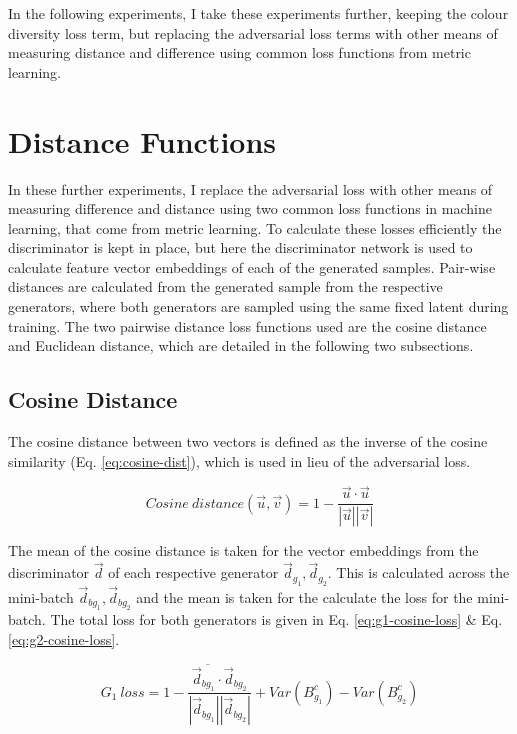 In the following experiments, I take these experiments further, keeping the colour diversity loss term, but replacing the adversarial loss terms with other means of measuring distance and difference using common loss functions from metric learning. 
  
\section{Distance Functions}

In these further experiments, I replace the adversarial loss with other means of measuring difference and distance using two common loss functions in machine learning, that come from metric learning. 
To calculate these losses efficiently the discriminator is kept in place, but here the discriminator network is used to calculate feature vector embeddings of each of the generated samples.
Pair-wise distances are calculated from the generated sample from the respective generators, where both generators are sampled using the same fixed latent during training.
The two pairwise distance loss functions used are the cosine distance and Euclidean distance, which are detailed in the following two subsections.

\subsection{Cosine Distance}

The cosine distance between two vectors is defined as the inverse of the cosine similarity (Eq. \ref{eq:cosine-dist}), which is used in lieu of the adversarial loss. 

\begin{equation} 
    Cosine\ distance(\vec u, \vec v) = 1 - \frac{\vec u \cdot \vec u}{|\vec u||\vec v|}
    \label{eq:cosine-dist}
\end{equation}

The mean of the cosine distance is taken for the vector embeddings from the discriminator $\vec d$ of each respective generator $\vec d_{g_{1}}, \vec d_{g_{2}}$. 
This is calculated across the mini-batch $\vec d_{bg_{1}}, \vec d_{bg_{2}}$  and the mean is taken for the calculate the loss for the mini-batch. 
The total loss for both generators is given in Eq. \ref{eq:g1-cosine-loss} \& Eq. \ref{eq:g2-cosine-loss}.

\begin{equation} 
    G_{1}\ loss = \overline{1 - \frac{\vec d_{bg_{1}} \cdot \vec d_{bg_{2}}}{|\vec d_{bg_{1}}||\vec d_{bg_{2}}|}} + Var(B_{g_{1}}^{c}) - Var(B_{g_{2}}^{c})
    \label{eq:g1-cosine-loss}
\end{equation}

